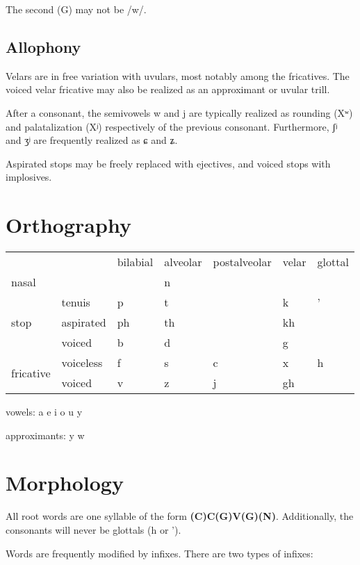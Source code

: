 \documentclass{article}
\begin{document}
The second (G) may not be /w/.

\subsection{Allophony}

Velars are in free variation with uvulars, most notably among the fricatives.
The voiced velar fricative may also be realized as an approximant or uvular
trill.

After a consonant, the semivowels w and j are typically realized as rounding
(Xʷ) and palatalization (Xʲ) respectively of the previous consonant.
Furthermore, ʃʲ and ʒʲ are frequently realized as ɕ and ʑ.

Aspirated stops may be freely replaced with ejectives, and voiced stops with
implosives.

\section{Orthography}

\begin{tabular}{lllllll}
    && bilabial & alveolar & postalveolar & velar & glottal \\
    nasal && & n \\
    \multirow{3}{*}{stop} & tenuis & p & t & & k & ' \\
    & aspirated & ph & th & & kh \\
    & voiced & b & d & & g \\
    \multirow{2}{*}{fricative} & voiceless & f & s & c & x & h \\
    & voiced & v & z & j & gh \\
\end{tabular}\bigskip

vowels: a e i o u y

approximants: y w

\section{Morphology}

All root words are one syllable of the form \textbf{(C)C(G)V(G)(N)}.
Additionally, the consonants will never be glottals (h or ').

Words are frequently modified by infixes. There are two types of infixes:
\end{document}
